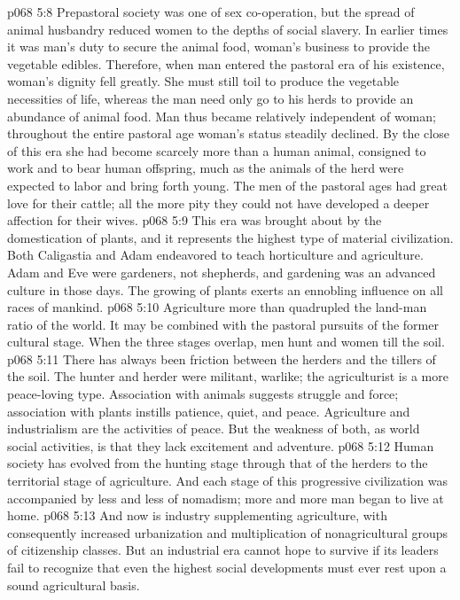 \vs p068 5:8 Prepastoral society was one of sex co\hyp{}operation, but the spread of animal husbandry reduced women to the depths of social slavery. In earlier times it was man’s duty to secure the animal food, woman’s business to provide the vegetable edibles. Therefore, when man entered the pastoral era of his existence, woman’s dignity fell greatly. She must still toil to produce the vegetable necessities of life, whereas the man need only go to his herds to provide an abundance of animal food. Man thus became relatively independent of woman; throughout the entire pastoral age woman’s status steadily declined. By the close of this era she had become scarcely more than a human animal, consigned to work and to bear human offspring, much as the animals of the herd were expected to labor and bring forth young. The men of the pastoral ages had great love for their cattle; all the more pity they could not have developed a deeper affection for their wives.
\vs p068 5:9 \pc {}\bibnobreakspace {} This era was brought about by the domestication of plants, and it represents the highest type of material civilization. Both Caligastia and Adam endeavored to teach horticulture and agriculture. Adam and Eve were gardeners, not shepherds, and gardening was an advanced culture in those days. The growing of plants exerts an ennobling influence on all races of mankind.
\vs p068 5:10 Agriculture more than quadrupled the land\hyp{}man ratio of the world. It may be combined with the pastoral pursuits of the former cultural stage. When the three stages overlap, men hunt and women till the soil.
\vs p068 5:11 There has always been friction between the herders and the tillers of the soil. The hunter and herder were militant, warlike; the agriculturist is a more peace\hyp{}loving type. Association with animals suggests struggle and force; association with plants instills patience, quiet, and peace. Agriculture and industrialism are the activities of peace. But the weakness of both, as world social activities, is that they lack excitement and adventure.
\vs p068 5:12 \pc Human society has evolved from the hunting stage through that of the herders to the territorial stage of agriculture. And each stage of this progressive civilization was accompanied by less and less of nomadism; more and more man began to live at home.
\vs p068 5:13 And now is industry supplementing agriculture, with consequently increased urbanization and multiplication of nonagricultural groups of citizenship classes. But an industrial era cannot hope to survive if its leaders fail to recognize that even the highest social developments must ever rest upon a sound agricultural basis.
